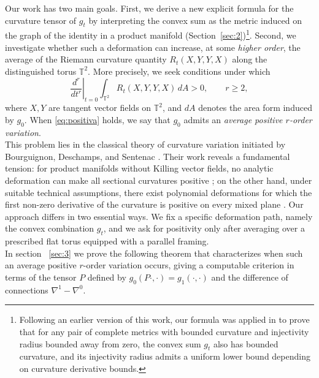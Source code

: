 \documentclass[graybox]{svmult}
\begin{document}
Our work has two main goals. First, we derive a new explicit formula for the curvature tensor of $g_t$ by interpreting the convex sum as the metric induced on the graph of the identity in a product manifold (Section~\ref{sec:2})\footnote{Following an earlier version of this work, our formula was applied in \cite{choi2024injectivityradiuslowerbound} to prove that for any pair of complete metrics with bounded curvature and injectivity radius bounded away from zero, the convex sum $g_t$ also has bounded curvature, and its injectivity radius admits a uniform lower bound depending on curvature derivative bounds.}. Second, we investigate whether such a deformation can increase, at some \emph{higher order}, the average of the Riemann curvature quantity $R_t(X,Y,Y,X)$ along the distinguished torus $\mathbb{T}^2$. More precisely, we seek conditions under which
\begin{equation}\label{eq:positiva}
\left.\frac{d^r}{dt^r}\right|_{t=0} \int_{\mathbb{T}^2} R_t(X,Y,Y,X)\, dA > 0, \qquad r \geq 2,
\end{equation}
where $X,Y$ are tangent vector fields on $\mathbb{T}^2$, and $dA$ denotes the area form induced by $g_0$. When \eqref{eq:positiva} holds, we say that $g_0$ admits an \emph{average positive $r$-order variation}.\\

This problem lies in the classical theory of curvature variation initiated by Bourguignon, Deschamps, and Sentenac \cite{Bourguignon1972, Bourguignon1973}. Their work reveals a fundamental tension: for product manifolds without Killing vector fields, no analytic deformation can make all sectional curvatures positive \cite[Theorem 7.8]{Bourguignon1972}; on the other hand, under suitable technical assumptions, there exist polynomial deformations for which the first non-zero derivative of the curvature is positive on every mixed plane \cite[Theorem 4.1]{Bourguignon1973}. Our approach differs in two essential ways. We fix a specific deformation path, namely the convex combination $g_t$, and we ask for positivity only after averaging over a prescribed flat torus equipped with a parallel framing.\\

In section ~\ref{sec:3} we prove the following theorem that characterizes when such an average positive $r$-order variation occurs, giving a computable criterion in terms of the tensor $P$ defined by $g_0(P\cdot,\cdot)=g_1(\cdot,\cdot)$ and the difference of connections $\nabla^1-\nabla^0$.
\end{document}
